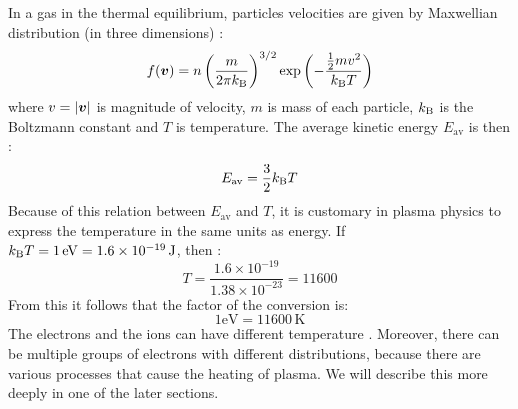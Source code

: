 In a gas in the thermal equilibrium, particles velocities are given by Maxwellian distribution (in three dimensions) \cite{plasma-intro3}:
\begin{equation}
	f(\bm{v}) = n\left(\frac{m}{2\pi k_\mathrm{B}}\right)^{3/2}\exp\left(-\frac{\frac{1}{2}m v^2}{k_\mathrm{B} T}\right)
\end{equation} 
\noindent where $v = \lvert \bm{v} \rvert$ is magnitude of velocity, $m$ is mass of each particle, $k_\mathrm{B}$ is the Boltzmann constant and $T$ is temperature. The average kinetic energy $E_{\mathrm{av}}$ is then \cite{plasma-intro3}:
\begin{equation}
	E_{\mathrm{av}}=\frac{3}{2}k_\mathrm{B} T
\end{equation}
Because of this relation between $E_{\mathrm{av}}$ and $T$, it is customary in plasma physics to express the temperature in the same units as energy. If $k_\mathrm{B} T = 1 \, \mathrm{eV} = 1.6 \times 10^{-19}\, \mathrm{J}$, then \cite{plasma-intro3}:
\begin{equation}
	T = \frac{1.6 \times 10^{-19}}{1.38\times 10^{-23}}=11600
\end{equation}
\noindent From this it follows that the factor of the conversion is:
\begin{equation}
	1 \mathrm{eV} = 11600\,\mathrm{K}
\end{equation} 
The electrons and the ions can have different temperature \cite{plasma-intro3}. Moreover, there can be multiple groups of electrons with different distributions, because there are various processes that cause the heating of plasma. We will describe this more deeply in one of the later sections.

